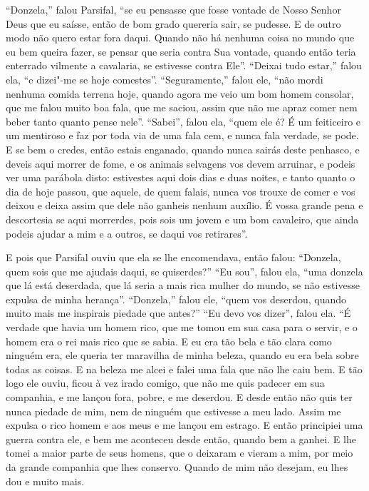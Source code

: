 “Donzela,” falou Parsifal, “se eu pensasse que fosse vontade de Nosso
Senhor Deus que eu saísse, então de bom grado quereria sair, se pudesse. E de
outro modo não quero estar fora daqui. Quando não há nenhuma coisa no mundo que
eu bem queira fazer, se pensar que seria contra Sua vontade, quando então teria
enterrado vilmente a cavalaria, se estivesse contra Ele”. “Deixai tudo
estar,” falou ela, “e dizei"-me se hoje comestes”. “Seguramente,” falou ele,
“não mordi nenhuma comida terrena hoje, quando agora me veio um bom homem
consolar, que me falou muito boa fala, que me saciou, assim que não me apraz
comer nem beber tanto quanto pense nele”. “Sabei”, falou ela, ``quem ele é? É um
feiticeiro e um mentiroso e faz por toda via de uma fala cem, e nunca fala
verdade, se pode. E se bem o credes, então estais enganado, quando nunca sairás
deste penhasco, e deveis aqui morrer de fome, e os animais selvagens vos devem
arruinar, e podeis ver uma parábola disto: estivestes aqui dois dias e duas
noites, e tanto quanto o dia de hoje passou, que aquele, de quem falais, nunca
vos trouxe de comer e vos deixou  e deixa assim que dele não ganheis nenhum
auxílio. É vossa grande pena e descortesia se aqui morrerdes, pois sois um
jovem e um bom cavaleiro, que ainda podeis ajudar a mim e a outros, se daqui
vos retirares”.

E pois que Parsifal ouviu que ela se lhe encomendava, então falou:
“Donzela, quem sois que me ajudais daqui, se quiserdes?” “Eu sou”, falou ela,
“uma donzela que lá está deserdada, que lá seria a mais rica mulher do mundo,
se não estivesse expulsa de minha herança”. “Donzela,” falou ele, “quem vos
deserdou, quando muito mais me inspirais piedade que antes?” “Eu devo vos
dizer”, falou ela. “É verdade que havia um homem rico, que me tomou em sua casa
para o servir, e o homem era o rei mais rico que se sabia. E eu era tão bela e
tão clara como  ninguém era, ele queria ter maravilha de minha beleza, quando
eu era bela sobre todas as coisas. E na beleza me alcei e falei uma fala que
não lhe caiu bem. E tão logo ele ouviu, ficou à vez irado comigo, que não me
quis padecer em sua companhia, e me lançou fora, pobre, e me deserdou. E desde
então não quis ter nunca piedade de mim, nem de ninguém que estivesse a meu
lado. Assim me expulsa o rico homem e aos meus e me lançou em estrago. E então
principiei uma guerra contra ele, e bem me aconteceu desde então, quando bem a
ganhei. E lhe tomei a maior parte de seus homens, que o deixaram e vieram a
mim, por meio da grande companhia que lhes conservo. Quando de mim não desejam,
eu lhes dou e muito mais.

